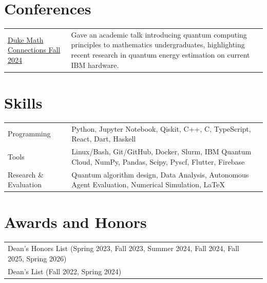 \documentclass[a4paper,12pt]{article}
\begin{document}

\section{Conferences}%
\begin{tabularx}{\linewidth}{@{}l X@{}}
    \href{https://math.duke.edu/research/research-grants/research-training-group/undergrad/undergrad-symposium24}{Duke Math Connections Fall 2024} & 
        Gave an academic talk introducing quantum computing principles to mathematics undergraduates, highlighting recent research in quantum energy
        estimation on current IBM hardware.
\end{tabularx}

\section{Skills}
\begin{tabularx}{\linewidth}{@{}l X@{}}
Programming & Python, Jupyter Notebook, Qiskit, C++, C, TypeScript, React, Dart, Haskell \\
Tools & Linux/Bash, Git/GitHub, Docker, Slurm, IBM Quantum Cloud, NumPy, Pandas, Scipy, Pyscf, Flutter, Firebase \\
Research \& Evaluation & Quantum algorithm design, Data Analysis, Autonomous Agent Evaluation, Numerical Simulation, \LaTeX \\
\end{tabularx}

\section{Awards and Honors}

\begin{tabularx}{\linewidth}{@{}l X@{}}
    Dean's Honors List (Spring 2023, Fall 2023, Summer 2024, Fall 2024, Fall 2025, Spring 2026)\\
    Dean's List (Fall 2022, Spring 2024)\\
\end{tabularx}

\vfill
{}
\end{document}
